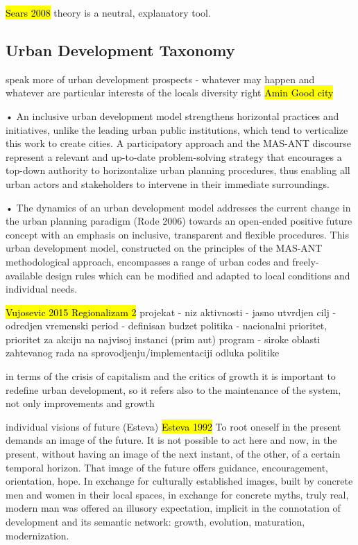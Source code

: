 \documentclass[11pt]{report}
\begin{document}
\hl{Sears 2008}
theory is a neutral, explanatory tool.

\subsection{Urban Development Taxonomy}

speak more of urban development prospects - whatever may happen and whatever are particular interests of the locals
diversity right \hl{Amin Good city}

•	An inclusive urban development model strengthens horizontal practices and initiatives, unlike the leading urban public institutions, which tend to verticalize this work to create cities. A participatory approach and the MAS-ANT discourse represent a relevant and up-to-date problem-solving strategy that encourages a top-down authority to horizontalize urban planning procedures, thus enabling all urban actors and stakeholders to intervene in their immediate surroundings. 

•	The dynamics of an urban development model addresses the current change in the urban planning paradigm (Rode 2006) towards an open-ended positive future concept with an emphasis on inclusive, transparent and flexible procedures. This urban development model, constructed on the principles of the MAS-ANT methodological approach, encompasses a range of urban codes and freely-available design rules which can be modified and adapted to local conditions and individual needs.

\hl{Vujosevic 2015 Regionalizam 2}
projekat - niz aktivnosti - jasno utvrdjen cilj - odredjen vremenski period - definisan budzet
politika - nacionalni prioritet, prioritet za akciju na najvisoj instanci (prim aut)
program - siroke oblasti zahtevanog rada na sprovodjenju/implementaciji odluka politike

in terms of the crisis of capitalism and the critics of growth it is important to redefine urban development, so it refers also to the maintenance of the system, not only improvements and growth

individual visions of future (Esteva)
\hl{Esteva 1992}
To root oneself in the present demands an image of the future. It is not possible to act here and now, in the present, without having an image of the next instant, of the other, of a certain temporal horizon. That image of the future offers guidance, encouragement, orientation, hope. In exchange for culturally established images, built by concrete men and women in their local spaces, in exchange for concrete myths, truly real, modern man was offered an illusory expectation, implicit in the connotation of development and its semantic network: growth, evolution, maturation, modernization. 
\end{document}
